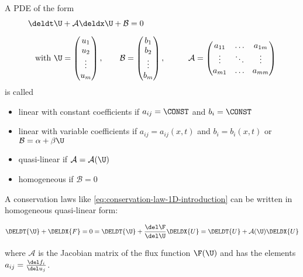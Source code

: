 A PDE of the form
%
\begin{align}
    \deldt &\U + \mathcal{A} \deldx \U + \mathcal{B} = 0 \\[.5em]
  \text{with }  &\U = \left( \begin{matrix}
                    u_1 \\ u_2 \\ \vdots \\ u_m \\
                    \end{matrix} \right),  \quad \quad
                \mathcal{B} = \left( \begin{matrix}
                    b_1 \\ b_2 \\ \vdots \\ b_m \\
                    \end{matrix} \right), & \quad \quad
                \mathcal{A} =\left( \begin{matrix}
                    a_{11} & \ldots & a_{1m} \\
                    \vdots & \ddots & \vdots \\
                    a_{m1} & \ldots & a_{mm} \\
                    \end{matrix} \right)
\end{align}
%
%
is called

\begin{itemize}
 \item linear with constant coefficients if $a_{ij} = \CONST$ and $b_i = \CONST$
 \item linear with variable coefficients if $a_{ij} = a_{ij}(x, t)$ and $b_i = b_i(x, t)$ or
$\mathcal{B} = \alpha + \beta \U$
 \item  quasi-linear if $\mathcal{A} = \mathcal{A}(\U)$
 \item homogeneous if $\mathcal{B} = 0$
\end{itemize}


A conservation laws like \ref{eq:conservation-law-1D-introduction} can be written in homogeneous
quasi-linear form:

\begin{align}
 \DELDT{\U} + \DELDX{F} = 0 = \DELDT{\U} + \frac{\del \F}{\del \U} \DELDX{U} = \DELDT{U} +
\mathcal{A}(\U) \DELDX{U}
\end{align}

where $\mathcal{A}$ is the Jacobian matrix of the flux function $\F(\U)$ and has the elements
$a_{ij} = \frac{\del f_i}{\del u_j}$.

